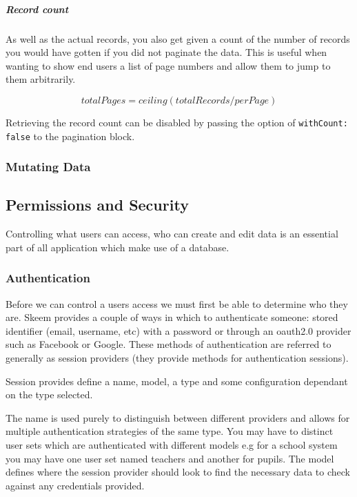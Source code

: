 \documentclass[
  12pt,
]{article}
\newcommand{\passthrough}[1]{#1}
\let\oldsubparagraph\subparagraph
\renewcommand{\subparagraph}[1]{\oldsubparagraph{#1}\mbox{}}
\begin{document}
\hypertarget{record-count}{%
\subparagraph{Record count}\label{record-count}}

As well as the actual records, you also get given a count of the number
of records you would have gotten if you did not paginate the data. This
is useful when wanting to show end users a list of page numbers and
allow them to jump to them arbitrarily.

\[ totalPages = ceiling( totalRecords / perPage ) \]

Retrieving the record count can be disabled by passing the option of
\passthrough{\lstinline!withCount: false!} to the pagination block.

\hypertarget{mutating-data}{%
\subsubsection{Mutating Data}\label{mutating-data}}

\hypertarget{permissions-and-security}{%
\subsection{Permissions and Security}\label{permissions-and-security}}

Controlling what users can access, who can create and edit data is an
essential part of all application which make use of a database.

\hypertarget{authentication}{%
\subsubsection{Authentication}\label{authentication}}

Before we can control a users access we must first be able to determine
who they are. Skeem provides a couple of ways in which to authenticate
someone: stored identifier (email, username, etc) with a password or
through an oauth2.0 provider such as Facebook or Google. These methods
of authentication are referred to generally as session providers (they
provide methods for authentication sessions).

Session provides define a name, model, a type and some configuration
dependant on the type selected.

The name is used purely to distinguish between different providers and
allows for multiple authentication strategies of the same type. You may
have to distinct user sets which are authenticated with different models
e.g for a school system you may have one user set named teachers and
another for pupils. The model defines where the session provider should
look to find the necessary data to check against any credentials
provided.
\end{document}
